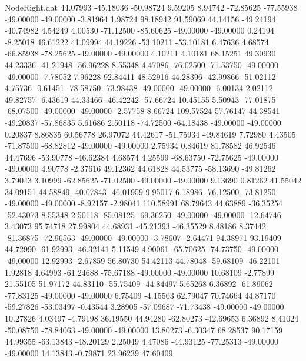 \begin{filecontents}{NodeRight.dat}
  44.07993  -45.18036  -50.98724     9.59205    8.94742  -72.85625  -77.55938  -49.00000  -49.00000   -3.81964    1.98724   98.18942   91.59069
  44.14156  -49.24194  -40.74982     4.54249    4.00530  -71.12500  -85.60625  -49.00000  -49.00000    0.24194   -8.25018   46.61222   41.09994
  44.19226  -53.10211  -53.10181     6.47636    4.68574  -66.85938  -78.25625  -49.00000  -49.00000    4.10211    4.10181   68.15251   49.30930
  44.23336  -41.21948  -56.96228     8.55348    4.47086  -76.02500  -71.53750  -49.00000  -49.00000   -7.78052    7.96228   92.84411   48.52916
  44.28396  -42.99866  -51.02112     4.75736   -0.61451  -78.58750  -73.98438  -49.00000  -49.00000   -6.00134    2.02112   49.82757   -6.43619
  44.33466  -46.42242  -57.66724    10.45155    5.50943  -77.01875  -68.07500  -49.00000  -49.00000   -2.57758    8.66724  109.57524   57.76147
  44.38541  -49.20837  -57.86835     5.61686    2.50118  -74.72500  -64.18438  -49.00000  -49.00000    0.20837    8.86835   60.56778   26.97072
  44.42617  -51.75934  -49.84619     7.72980    4.43505  -71.87500  -68.82812  -49.00000  -49.00000    2.75934    0.84619   81.78582   46.92546
  44.47696  -53.90778  -46.62384     4.68574    4.25599  -68.63750  -72.75625  -49.00000  -49.00000    4.90778   -2.37616   49.12362   44.61828
  44.53775  -58.13690  -49.81262     3.79043    3.10999  -62.85625  -71.02500  -49.00000  -49.00000    9.13690    0.81262   41.55042   34.09151
  44.58849  -40.07843  -46.01959     9.95017    6.18986  -76.12500  -73.81250  -49.00000  -49.00000   -8.92157   -2.98041  110.58991   68.79643
  44.63889  -36.35254  -52.43073     8.55348    2.50118  -85.08125  -69.36250  -49.00000  -49.00000  -12.64746    3.43073   95.74718   27.99804
  44.68931  -45.21393  -46.35529     8.48186    8.37442  -81.36875  -72.96563  -49.00000  -49.00000   -3.78607   -2.64471   94.38971   93.19409
  44.72990  -61.92993  -46.32141     5.11549    4.90061  -65.70625  -74.73750  -49.00000  -49.00000   12.92993   -2.67859   56.80730   54.42113
  44.78048  -59.68109  -46.22101     1.92818    4.64993  -61.24688  -75.67188  -49.00000  -49.00000   10.68109   -2.77899   21.55105   51.97172
  44.83110  -55.75409  -44.84497     5.65268    6.36892  -61.89062  -77.83125  -49.00000  -49.00000    6.75409   -4.15503   62.79047   70.74664
  44.87170  -59.27826  -53.03497    -0.43544    3.28905  -57.09687  -71.73438  -49.00000  -49.00000   10.27826    4.03497   -4.79198   36.19550
  44.94280  -62.80273  -42.69653     6.36892    8.41024  -50.08750  -78.84063  -49.00000  -49.00000   13.80273   -6.30347   68.28537   90.17159
  44.99355  -63.13843  -48.20129     2.25049    4.47086  -44.93125  -77.25313  -49.00000  -49.00000   14.13843   -0.79871   23.96239   47.60409

\end{filecontents}
